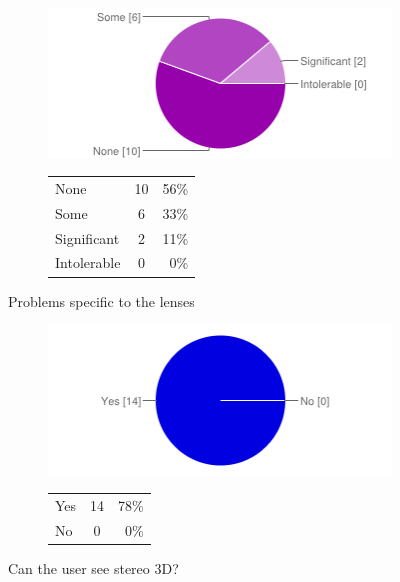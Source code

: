 \documentclass[MSc,paper=a4,pagesize=auto]{icldt}
\begin{document}
\begin{figure}[htbp!]
\centering
\begin{subfigure}{0.4\textwidth}
    \centering
    \includegraphics[width=1\linewidth]{resources/6-lens_problems}
\end{subfigure}%
\centering
\begin{subfigure}{0.5\textwidth}
    \centering
   	\begin{tabular}{ l c r }
None&10&56\% \\
Some&6&33\% \\
Significant&2&11\% \\
Intolerable&0&0\% \\
\end{tabular}
\end{subfigure} 
    \caption{Problems specific to the lenses}
    \label{fig:6-lens_problems}
\end{figure}
\begin{figure}[htbp!]
\centering
\begin{subfigure}{0.4\textwidth}
    \centering
    \includegraphics[width=1\linewidth]{resources/7-can_see_3D}
\end{subfigure}%
\centering
\begin{subfigure}{0.5\textwidth}
    \centering
   	\begin{tabular}{ l c r }
Yes&14&78\% \\
No&0&0\% \\
\end{tabular}
\end{subfigure} 
    \caption{Can the user see stereo 3D?}
    \label{fig:7-can_see_3D}
\end{figure}
\end{document}
